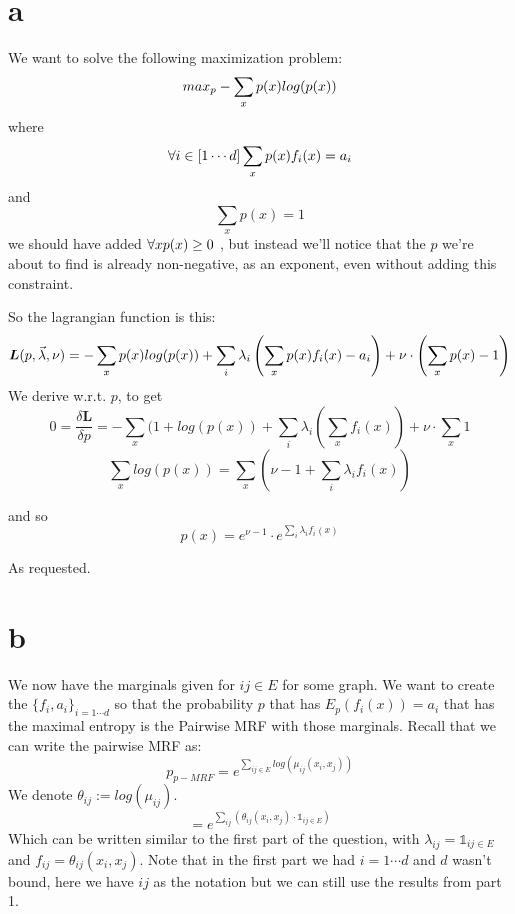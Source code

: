 \documentclass[11pt]{article}
\begin{document}
\section*{a}
We want to solve the following maximization problem:
$$
max_p \space -\sum_xp(x)log(p(x))
$$
where
$$
\forall i \in [1\cdots d] \space \sum_x p(x)f_i(x)=a_i
$$
and 
$$
\sum_x p(x) = 1
$$
we should have added $\forall x\space  p(x) \ge 0 $  , but instead we'll notice that the $p$ we're about to find is already non-negative, as an exponent, even without adding this constraint.

So the lagrangian function is this:
$$
\boldsymbol{L}(p, \vec{\lambda},\nu) = -\sum_x p(x)log(p(x)) + \sum_i \lambda_i\left(\sum_x p(x)f_i(x) \space - a_i\right) + \nu \cdot \left(\sum_xp(x)-1\right)
$$
We derive w.r.t. $p$, to get 
$$
0 = \frac{\delta \boldsymbol{L}}{\delta p} = -\sum_x (1+log(p(x)) + \sum_i \lambda_i \left(\sum_x f_i(x)\right) + \nu\cdot \sum_x 1
$$
$$
\sum_x log(p(x)) = \sum_x \left(\nu-1 + \sum_i \lambda_i f_i(x) \right) 
$$

and so 
$$
p(x) = e^{\nu - 1} \cdot e^{\sum_i \lambda_i f_i(x)}
$$

As requested.


\section*{b}We now have the marginals given for $ij \in E$ for some graph.
We want to create the $\{f_i, a_i\}_{i=1\cdots d}$ so that the probability $p$ that has $E_p\left(f_i(x)\right)=a_i$ that has the maximal entropy is the Pairwise MRF with those marginals.
Recall that we can write the pairwise MRF as:
\begin{equation*}
p_{p-MRF}=e^{\sum_{ij\in E}log\left(\mu_{ij}(x_i, x_j)\right)}
\end{equation*}
We denote $\theta_{ij} := log(\mu_{ij})$.
\begin{equation*}
= e^{\sum_{ij}\left(\theta_{ij}\left(x_i,x_j\right)\cdot \mathds{1}_{ij\in E}\right)}
\end{equation*}
Which can be written similar to the first part of the question, with $\lambda_{ij} = \mathds{1}_{ij\in E}$ and $f_{ij} = \theta_{ij}\left(x_i,x_j\right)$. Note that in the first part we had $i = 1\cdots d$ and $d$ wasn't bound, here we have $ij$ as the notation but we can still use the results from part 1.
\end{document}
